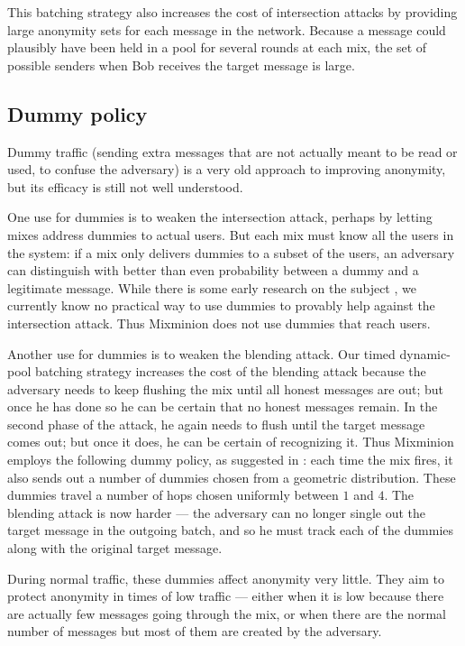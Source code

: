\documentclass[11pt]{IEEEtran}
\begin{document}
This batching strategy also increases the cost of intersection attacks by
providing large anonymity sets for each message in the network. Because
a message could plausibly have been held in a pool for several rounds
at each mix, the set of possible senders when Bob receives the target
message is large.

\subsection{Dummy policy}

Dummy traffic (sending extra messages that are not actually meant to
be read or used, to confuse the adversary) is a very old approach to
improving anonymity, but its efficacy is still not well understood.

One use for dummies is to weaken the intersection attack, perhaps
by letting mixes address dummies to actual users. But each mix must
know all the users in the system: if a mix only delivers dummies to a
subset of the users, an adversary can distinguish with better than even
probability between a dummy and a legitimate message. While there is
some early research on the subject \cite{langos02}, we currently know no
practical way to use dummies to provably help against the intersection
attack. Thus Mixminion does not use dummies that reach users.

Another use for dummies is to weaken the blending attack. Our timed
dynamic-pool batching strategy increases the cost of the blending attack
because the adversary needs to keep flushing the mix until all honest
messages are out; but once he has done so he can be certain that no
honest messages remain. In the second phase of the attack, he again
needs to flush until the target message comes out; but once it does, he
can be certain of recognizing it. Thus Mixminion employs the following
dummy policy, as suggested in \cite{andrei-claudia}: each time the mix
fires, it also sends out a number of dummies chosen from a geometric
distribution. These dummies travel a number of hops chosen uniformly
between $1$ and $4$. The blending attack is now harder --- the adversary
can no longer single out the target message in the outgoing batch, and so
he must track each of the dummies along with the original target message.

During normal traffic, these dummies affect anonymity very little. They
aim to protect anonymity in times of low traffic --- either when it
is low because there are actually few messages going through the mix,
or when there are the normal number of messages but most of them are
created by the adversary.
\end{document}
